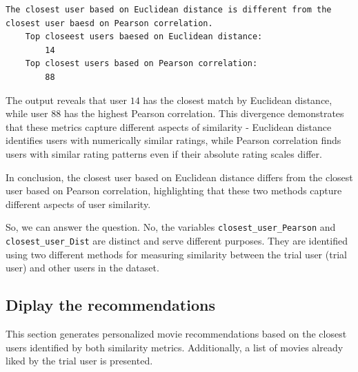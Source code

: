 \begin{lstlisting}[style=StyleResult]
	The closest user based on Euclidean distance is different from the closest user baesd on Pearson correlation.
	Top closeest users baesed on Euclidean distance:
		14
	Top closest users based on Pearson correlation:
		88
\end{lstlisting}

The output reveals that user $14$ has the closest match by Euclidean distance, while user $88$ has the highest Pearson correlation. This divergence demonstrates that these metrics capture different aspects of similarity - Euclidean distance identifies users with numerically similar ratings, while Pearson correlation finds users with similar rating patterns even if their absolute rating scales differ.

In conclusion, the closest user based on Euclidean distance differs from the closest user based on Pearson correlation, highlighting that these two methods capture different aspects of user similarity.

So, we can answer the question. No, the variables \texttt{closest\_user\_Pearson} and \texttt{closest\_user\_Dist} are distinct and serve different purposes. They are identified using two different methods for measuring similarity between the trial user (trial user) and other users in the dataset.

\subsection{Diplay the recommendations}

This section generates personalized movie recommendations based on the closest users identified by both similarity metrics. Additionally, a list of movies already liked by the trial user is presented.

